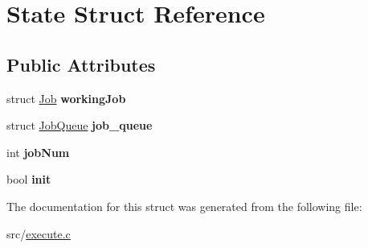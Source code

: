 \hypertarget{structState}{}\section{State Struct Reference}
\label{structState}
\subsection*{Public Attributes}
\begin{DoxyCompactItemize}
\item 
struct \hyperlink{structJob}{Job} {\bfseries working\+Job}\hypertarget{structState_ae98c1a745f0259f6356ee3d46e8b2e1e}{}\label{structState_ae98c1a745f0259f6356ee3d46e8b2e1e}

\item 
struct \hyperlink{structJobQueue}{Job\+Queue} {\bfseries job\+\_\+queue}\hypertarget{structState_ae07e5278543aaa89ae55e6a761cb763c}{}\label{structState_ae07e5278543aaa89ae55e6a761cb763c}

\item 
int {\bfseries job\+Num}\hypertarget{structState_a09693b8df6af317797f0e7ff9fb53844}{}\label{structState_a09693b8df6af317797f0e7ff9fb53844}

\item 
bool {\bfseries init}\hypertarget{structState_a9b7b1e17a4b62475adbafc514224c278}{}\label{structState_a9b7b1e17a4b62475adbafc514224c278}

\end{DoxyCompactItemize}


The documentation for this struct was generated from the following file\+:\begin{DoxyCompactItemize}
\item 
src/\hyperlink{execute_8c}{execute.\+c}\end{DoxyCompactItemize}
